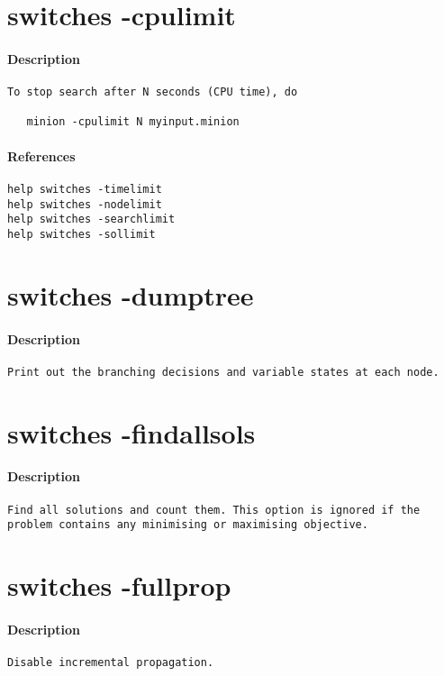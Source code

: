 \section{switches -cpulimit}
\paragraph{Description}
{\footnotesize
\begin{verbatim}
To stop search after N seconds (CPU time), do

   minion -cpulimit N myinput.minion
\end{verbatim}
}
\paragraph{References}
{\footnotesize
\begin{verbatim}
help switches -timelimit
help switches -nodelimit
help switches -searchlimit
help switches -sollimit
\end{verbatim}
}
\section{switches -dumptree}
\paragraph{Description}
{\footnotesize
\begin{verbatim}
Print out the branching decisions and variable states at each node.
\end{verbatim}
}
\section{switches -findallsols}
\paragraph{Description}
{\footnotesize
\begin{verbatim}
Find all solutions and count them. This option is ignored if the
problem contains any minimising or maximising objective.
\end{verbatim}
}
\section{switches -fullprop}
\paragraph{Description}
{\footnotesize
\begin{verbatim}
Disable incremental propagation.
\end{verbatim}
}
